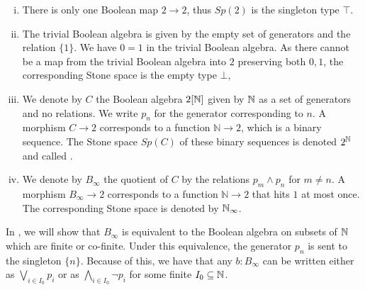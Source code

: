 \begin{example}
  \label{boolean-algebra-examples}
  \begin{enumerate}[(i)]
  \item There is only one Boolean map $2\to 2$, thus $Sp(2)$ is the singleton type $\top$. 
  \item   The trivial Boolean algebra is given by the empty set of generators and the relation $\{1\}$.
    We have $0=1$ in the trivial Boolean algebra. 
    As there cannot be a map from the trivial Boolean algebra into $2$ preserving both $0,1$, 
    the corresponding Stone space is the empty type $\bot$, 
  \item\label{ExampleBAunderCantor}   
    We denote by $C$ the Boolean algebra $2[\mathbb{N}]$ given by $\mathbb{N}$ as a set of generators and no relations. We write $p_n$ for the generator corresponding to $n$.
    A morphism $C\to 2$ corresponds to a function $\mathbb N\to 2$, which is a binary sequence. 
    The Stone space $Sp(C)$ of these binary sequences is denoted $2^{\mathbb{N}}$ and called .
  \item\label{ExampleBAunderNinfty}
    We denote by $B_\infty$ the quotient of $C$ by the relations $p_m\wedge p_n$ for $m\neq n$. 
    A morphism $B_\infty\to 2$ corresponds to a function $\mathbb N \to 2$ that hits $1$ at most once. 
    The corresponding Stone space is denoted by $\mathbb{N}_\infty$. 
  \end{enumerate}
\end{example}

\begin{remark}\label{BinftyTermsWriting}
  In , we will show that $B_\infty$ is equivalent to the Boolean algebra on 
  subsets of $\mathbb{N}$ which are finite or co-finite. 
  Under this equivalence, the generator $p_n$ is sent to the singleton $\{n\}$. 
  Because of this, we have that any $b:B_\infty$ can be written 
  either as $\bigvee_{i\in I_0} p_i$ or as $\bigwedge_{i\in I_0} \neg p_i$ for some finite $I_0\subseteq \mathbb{N}$. 
\end{remark}





